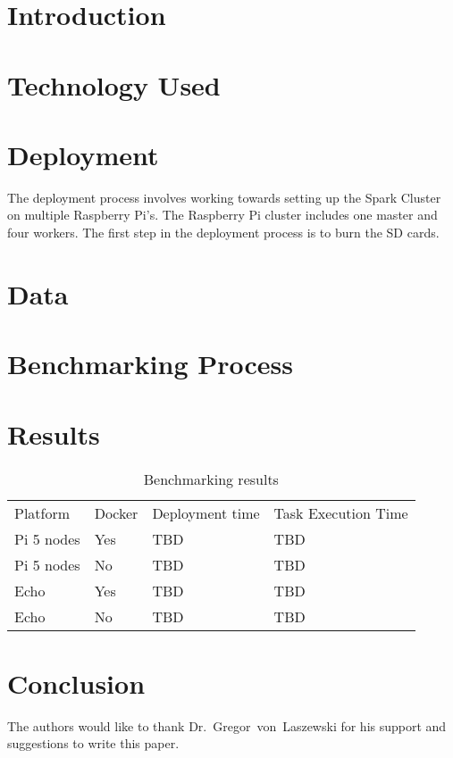 \section{Introduction}

\section{Technology Used}


\section{Deployment}

The deployment process involves working towards setting up the 
Spark Cluster on multiple Raspberry Pi's. The Raspberry Pi cluster
includes one master and four workers. The first step in the 
deployment process is to burn the SD cards.

\section{Data}


\section{Benchmarking Process}

\section{Results}

\begin{table}[hbt]
\centering
\caption{Benchmarking results}\label{t:results-table}
\begin{tabular}{llll}
Platform    & Docker & Deployment time & Task Execution Time \\
Pi 5 nodes  & Yes    & TBD             & TBD            \\
Pi 5 nodes  & No     & TBD             & TBD            \\
Echo        & Yes    & TBD             & TBD            \\
Echo        & No     & TBD             & TBD            \\
\end{tabular}
\end{table}



\section{Conclusion}


\begin{acks}

  The authors would like to thank Dr.~Gregor~von~Laszewski 
  for his support and suggestions to write this paper.
  
\end{acks}



